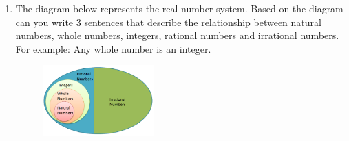 \documentclass{article}
\begin{document}
\begin{enumerate}[resume]
\item The diagram below represents the real number system. Based on the diagram can you write 3 sentences that describe the relationship between natural numbers, whole numbers, integers, rational numbers and irrational numbers. For example: Any whole number is an integer.

  \begin{figure}[h!]
    \centering
    \includegraphics[width=0.4\textwidth]{diagram.png}
  \end{figure}
\end{enumerate}
\end{document}
